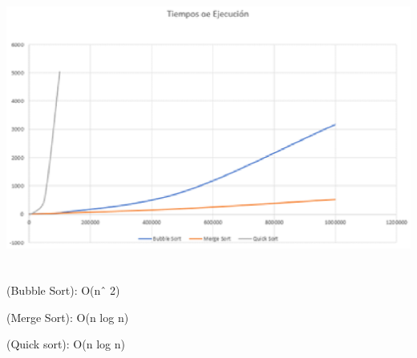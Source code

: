 ﻿\documentclass{article} %
\begin{document}
\noindent 

\noindent \includegraphics*[width=6.13in, height=3.65in, keepaspectratio=false]{image2}

\noindent 

\noindent (Bubble  Sort):  O(nˆ 2)

\noindent (Merge Sort):  O(n log n)

\noindent (Quick sort): O(n log n)
\end{document}
